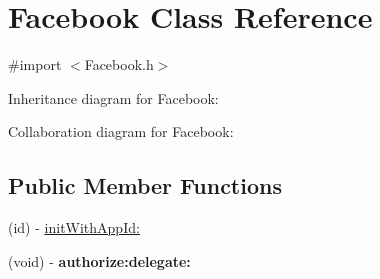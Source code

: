 \hypertarget{interface_facebook}{
\section{\-Facebook \-Class \-Reference}
\label{interface_facebook}
}


{\ttfamily \#import $<$\-Facebook.\-h$>$}



\-Inheritance diagram for \-Facebook\-:


\-Collaboration diagram for \-Facebook\-:
\subsection*{\-Public \-Member \-Functions}
\begin{DoxyCompactItemize}
\item 
(id) -\/ \hyperlink{interface_facebook_aa85460ff62b6bf81946548b7983b931d}{init\-With\-App\-Id\-:}
\item 
\hypertarget{interface_facebook_ae8e4829a8dbf6270c1fa9ee66726560c}{
(void) -\/ {\bfseries authorize\-:delegate\-:}}
\label{interface_facebook_ae8e4829a8dbf6270c1fa9ee66726560c}


\end{DoxyCompactItemize}
